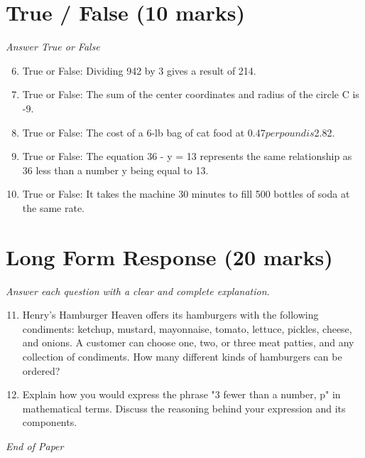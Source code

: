 \documentclass[12pt]{article}
\begin{document}
\section*{True / False (10 marks)}
\textit{Answer True or False}
\begin{enumerate}[label=\arabic*.]
\setcounter{enumi}{5}
\item True or False: Dividing 942 by 3 gives a result of 214.
\item True or False: The sum of the center coordinates and radius of the circle C is -9.
\item True or False: The cost of a 6-lb bag of cat food at $0.47 per pound is $2.82.
\item True or False: The equation 36 - y = 13 represents the same relationship as 36 less than a number y being equal to 13.
\item True or False: It takes the machine 30 minutes to fill 500 bottles of soda at the same rate.
\end{enumerate}

\section*{Long Form Response (20 marks)}
\textit{Answer each question with a clear and complete explanation.}
\begin{enumerate}[label=\arabic*.]
\setcounter{enumi}{10}
\item Henry's Hamburger Heaven offers its hamburgers with the following condiments: ketchup, mustard, mayonnaise, tomato, lettuce, pickles, cheese, and onions. A customer can choose one, two, or three meat patties, and any collection of condiments. How many different kinds of hamburgers can be ordered?
\item Explain how you would express the phrase "3 fewer than a number, p" in mathematical terms. Discuss the reasoning behind your expression and its components.
\end{enumerate}

\vfill
\noindent\textit{End of Paper}
\end{document}
